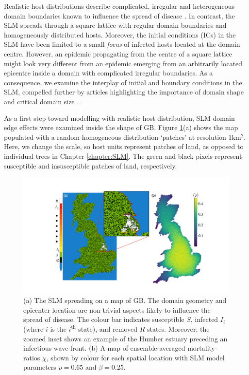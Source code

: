 Realistic host distributions describe complicated, irregular and heterogeneous domain boundaries
known to influence the spread of disease \cite{madden1995plant}.
In contrast, the SLM spreads through a square lattice with regular domain boundaries and homogeneously distributed hosts.
Moreover, the initial conditions (ICs) in the SLM have been limited to a small \textit{focus} of infected hosts
located at the domain centre.
However, an epidemic propagating from the centre of a square lattice might look very different
from an epidemic emerging from an arbitrarily located epicentre inside a domain with complicated irregular boundaries.
As a consequence, we examine the interplay of initial and boundary conditions in the SLM,
compelled further by articles highlighting the importance of domain shape \cite{mikaberidze2016invasiveness} and critical domain size \cite{abad2020reaction, reimer2017critical}.

As a first step toward modelling with realistic host distribution,
SLM domain edge effects were examined inside the shape of GB.
Figure \ref{fig:uk-spread-primer}(a) shows the map populated 
with a random homogeneous distribution `patches' at resolution $1\mathrm{km^2}$. 
Here, we change the scale, so host units represent patches of land, 
as opposed to individual trees in Chapter \ref{chapter:SLM}.
The green and black pixels represent susceptible and insusceptible patches of land, respectively.

\begin{figure}
    \centering
    \includegraphics[scale=0.32]{chapter4/figures/figure1-GB-BCs.pdf}
    \caption{(a) The SLM spreading on a map of GB. The domain geometry and epicenter %
    location are non-trivial aspects likely to influence the spread of disease.
    The colour bar indicates susceptible $S$, infected $I_i$ (where $i$ is the $i^{\mathrm{th}}$ state), and removed $R$ states. Moreover, the zoomed inset shows an example of the Humber estuary preceding an infectious wave-front. (b) A map of ensemble-averaged mortality-ratios $\chi$, shown by colour for each spatial location with SLM model parameters $\rho=0.65$ and $\beta=0.25$.}
    \label{fig:uk-spread-primer}
\end{figure}

